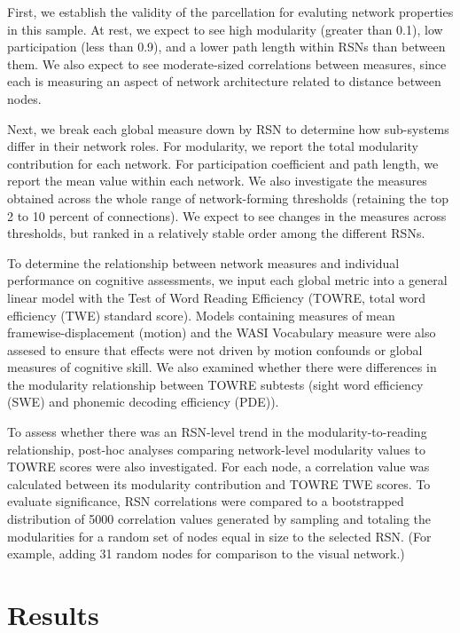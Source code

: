 First, we establish the validity of the parcellation for evaluting network properties in this sample. At rest, we expect to see high modularity (greater than 0.1), low participation (less than 0.9), and a lower path length within RSNs than between them. We also expect to see moderate-sized correlations between measures, since each is measuring an aspect of network architecture related to distance between nodes.  

Next, we break each global measure down by RSN to determine how sub-systems differ in their network roles. For modularity, we report the total modularity contribution for each network. For participation coefficient and path length, we report the mean value within each network. We also investigate the measures obtained across the whole range of network-forming thresholds (retaining the top 2 to 10 percent of connections). We expect to see changes in the measures across thresholds, but ranked in a relatively stable order among the different RSNs. 

To determine the relationship between network measures and individual performance on cognitive assessments, we input each global metric into a general linear model with the Test of Word Reading Efficiency (TOWRE, total word efficiency (TWE) standard score). Models containing measures of mean framewise-displacement (motion) and the WASI Vocabulary measure were also assesed to ensure that effects were not driven by motion confounds or global measures of cognitive skill. We also examined whether there were differences in the modularity relationship between TOWRE subtests (sight word efficiency (SWE) and phonemic decoding efficiency (PDE)). 

To assess whether there was an RSN-level trend in the modularity-to-reading relationship, post-hoc analyses comparing network-level modularity values to TOWRE scores were also investigated. For each node, a correlation value was calculated between its modularity contribution and TOWRE TWE scores. To evaluate significance, RSN correlations were compared to a bootstrapped distribution of 5000 correlation values generated by sampling and totaling the modularities for a random set of nodes equal in size to the selected RSN. (For example, adding 31 random nodes for comparison to the visual network.)


\section{Results} 


